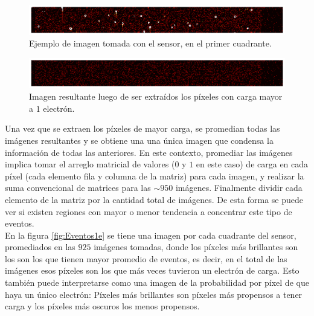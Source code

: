 \begin{figure}[h]
    \centering
    \includegraphics[scale=0.4]{Figs/imagen_fits_original.pdf}
    \caption{\footnotesize{Ejemplo de imagen tomada con el sensor, en el primer cuadrante.}}
    \label{fig:ImagenFitsOriginal}
\end{figure}

\begin{figure}[h]
    \centering
    \includegraphics[scale=0.4]{Figs/imagen_fits_1_e.pdf}
    \caption{\footnotesize{Imagen resultante luego de ser extraídos los píxeles con carga mayor a $1$ electrón.}}
    \label{fig:ImagenFits1e}
\end{figure}
Una vez que se extraen los píxeles de mayor carga, se promedian todas las imágenes resultantes y se obtiene una una única imagen que condensa la información de todas las anteriores. En este contexto, promediar las imágenes implica tomar el arreglo matricial de valores ($0$ y $1$ en este caso) de carga en cada píxel (cada elemento fila y columna de la matriz) para cada imagen, y realizar la suma convencional de matrices para las $\sim 950$ imágenes. Finalmente dividir cada elemento de la matriz por la cantidad total de imágenes. De esta forma se puede ver si existen regiones con mayor o menor tendencia a concentrar este tipo de eventos.\\
\indent En la figura \ref{fig:Eventos1e} se tiene una imagen por cada cuadrante del sensor, promediados en las $925$ imágenes tomadas, donde los píxeles más brillantes son los son los que tienen mayor promedio de eventos, es decir, en el total de las imágenes esos píxeles son los que más veces tuvieron un electrón de carga. Esto también puede interpretarse como una imagen de la probabilidad por píxel de que haya un único electrón: Píxeles más brillantes son píxeles más propensos a tener carga y los píxeles más oscuros los menos propensos.\\

